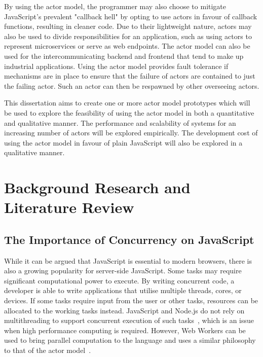 \documentclass[12pt]{report}
\begin{document}
By using the actor model, the programmer may also choose to mitigate JavaScript's prevalent "callback hell" by opting to use actors in favour of callback functions, resulting in cleaner code. Due to their lightweight nature, actors may also be used to divide responsibilities for an application, such as using actors to represent microservices or serve as web endpoints\cite{hewitt2010actor}.  The actor model can also be used for the intercommunicating backend and frontend that tend to make up industrial applications. Using the actor model provides fault tolerance if mechanisms are in place to ensure that the failure of actors are contained to just the failing actor. Such an actor can then be respawned by other overseeing actors.

This dissertation aims to create one or more actor model prototypes which will be used to explore the feasibility of using the actor model in both a quantitative and qualitative manner. The performance and scalability of systems for an increasing number of actors will be explored empirically. The development cost of using the actor model in favour of plain JavaScript will also be explored in a qualitative manner.
\section{Background Research and Literature Review}
\subsection{The Importance of Concurrency on JavaScript}
While it can be argued that JavaScript is essential to modern browsers, there is also a growing popularity for server-side JavaScript. Some tasks may require significant computational power to execute. By writing concurrent code, a developer is able to write applications that utilise multiple threads, cores, or devices. If some tasks require input from the user or other tasks, resources can be allocated to the working tasks instead. JavaScript and Node.js do not rely on multithreading to support concurrent execution of such tasks~\cite{highperformance}, which is an issue when high performance computing is required. However, Web Workers can be used to bring parallel computation to the language and uses a similar philosophy to that of the actor model~\cite{concurrencyjs}.
\end{document}
